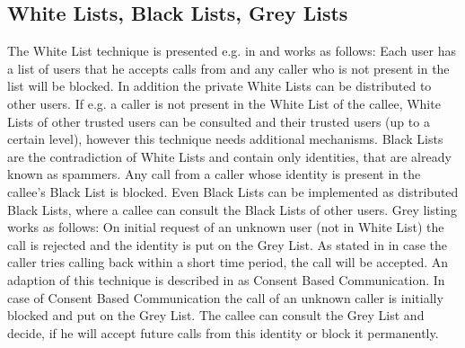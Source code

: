 \documentclass[final
	]{issa}
\begin{document}
\subsection{White Lists, Black Lists, Grey Lists}
The White List technique is presented e.g. in \cite{paper:SPITreach} \cite{rfc:5039} and works as follows: Each user has a list of users that he accepts calls from and any caller who is not present in the list will be blocked. In addition the private White Lists can be distributed to other users. If e.g. a caller is not present in the White List of the callee, White Lists of other trusted users can be consulted and their trusted users (up to a certain level), however this technique needs additional mechanisms.
Black Lists are the contradiction of White Lists and contain only identities, that are already known as spammers. Any call from a caller whose identity is present in the callee's Black List is blocked. Even Black Lists can be implemented as distributed Black Lists, where a callee can consult the Black Lists of other users.
Grey listing works as follows: On initial request of an unknown user (not in White List) the call is rejected and the identity is put on the Grey List. As stated in \cite{paper:SPITreach} in case the caller tries calling back within a short time period, the call will be accepted. An adaption of this technique is described in \cite{rfc:5039} as Consent Based Communication. In case of Consent Based Communication the call of an unknown caller is initially blocked and put on the Grey List. The callee can consult the Grey List and decide, if he will accept future calls from this identity or block it permanently.
\end{document}
